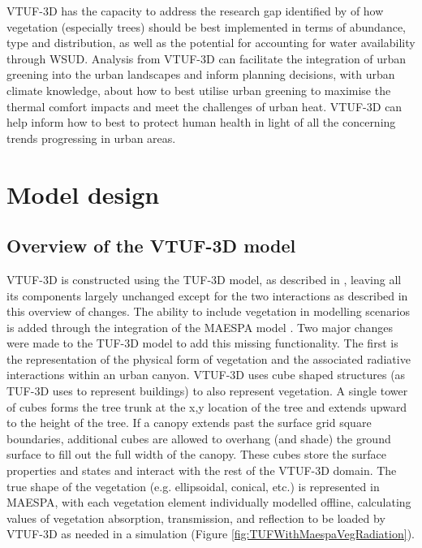 \documentclass[final,3p,times,authoryear]{elsarticle}
\begin{document}
VTUF-3D has the capacity to address the research gap identified by \cite{Bowler2010} of how vegetation (especially trees) should be best implemented in terms of abundance, type and distribution, as well as the potential for accounting for water availability through WSUD. Analysis from VTUF-3D can facilitate the integration of urban greening into the urban landscapes and inform planning decisions, with urban climate knowledge, about how to best utilise urban greening to maximise the thermal comfort impacts and meet the challenges of urban heat. VTUF-3D can help inform how to best to protect human health in light of all the concerning trends progressing in urban areas.

\section{Model design}\label{sec:method}

\subsection{Overview of the VTUF-3D model}\label{sec:DesignOverview}

VTUF-3D is constructed using the TUF-3D model, as described in \cite{Krayenhoff2007}, leaving all its components largely unchanged except for the two interactions as described in this overview of changes. The ability to include vegetation in modelling scenarios is added through the integration of the MAESPA model \citep{Duursma2012}. Two major changes were made to the TUF-3D model to add this missing functionality. The first is the representation of the physical form of vegetation and the associated radiative interactions within an urban canyon. VTUF-3D uses cube shaped structures (as TUF-3D uses to represent buildings) to also represent vegetation. A single tower of cubes forms the tree trunk at the x,y location of the tree and extends upward to the height of the tree. If a canopy extends past the surface grid square boundaries, additional cubes are allowed to overhang (and shade) the ground surface to fill out the full width of the canopy. These cubes store the surface properties and states and interact with the rest of the VTUF-3D domain. The true shape of the vegetation (e.g. ellipsoidal, conical, etc.) is represented in MAESPA, with each vegetation element individually modelled offline, calculating values of vegetation absorption, transmission, and reflection to be loaded by VTUF-3D as needed in a simulation (Figure \ref{fig:TUFWithMaespaVegRadiation}).
\end{document}

